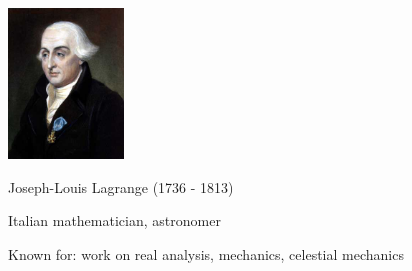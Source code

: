 \begin{frame}
	\hfil\hfil \includegraphics[height=4cm]{../../modules/history/pictures/lagrange.jpg}
	
	\hfil\hfil Joseph-Louis Lagrange (1736 - 1813)
	
	\hfil\hfil Italian mathematician, astronomer
	
	\hfil\hfil Known for: work on real analysis, mechanics, celestial mechanics
	
	
\end{frame}